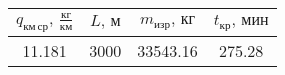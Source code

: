 \begin{tabular}{|c|c|c|c|}
\hline
$q_{км\, ср},\, \frac{кг}{км}$ & $L,\, м$ & $m_{изр},\, кг$ & $t_{кр},\, мин$ \\ 
\hline
11.181 & 3000 & 33543.16 & 275.28 \\ 
\hline
\end{tabular}